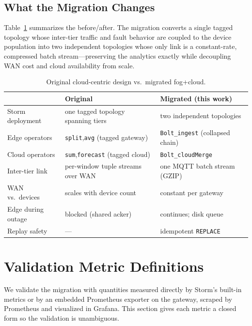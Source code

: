 \documentclass[conference]{IEEEtran}
\newcommand{\code}[1]{\texttt{#1}}
\begin{document}
\subsection{What the Migration Changes}\label{sec:arch-summary}
Table~\ref{tab:beforeafter} summarizes the before/after. The migration converts a
single tagged topology whose inter-tier traffic and fault behavior are coupled to
the device population into two independent topologies whose only link is a
constant-rate, compressed batch stream---preserving the analytics exactly while
decoupling WAN cost and cloud availability from scale.

\begin{table}[t]
\centering
\caption{Original cloud-centric design vs.\ migrated fog+cloud.}
\label{tab:beforeafter}
\footnotesize
\setlength{\tabcolsep}{3.5pt}
\begin{tabular}{p{2.5cm}p{2.5cm}p{2.5cm}}
\toprule
 & Original~\cite{pham2021} & Migrated (this work) \\
\midrule
Storm deployment & one tagged topology spanning tiers & two independent topologies \\
Edge operators & \code{split},\code{avg} (tagged gateway) & \code{Bolt\_ingest} (collapsed chain) \\
Cloud operators & \code{sum},\code{forecast} (tagged cloud) & \code{Bolt\_cloudMerge} \\
Inter-tier link & per-window tuple streams over WAN & one MQTT batch stream (GZIP) \\
WAN vs.\ devices & scales with device count & constant per gateway \\
Edge during outage & blocked (shared acker) & continues; disk queue \\
Replay safety & --- & idempotent \code{REPLACE} \\
\bottomrule
\end{tabular}
\end{table}

\section{Validation Metric Definitions}\label{sec:metrics}
We validate the migration with quantities measured directly by Storm's built-in
metrics or by an embedded Prometheus exporter on the gateway, scraped by
Prometheus and visualized in Grafana. This section gives each metric a closed
form so the validation is unambiguous.
\end{document}
